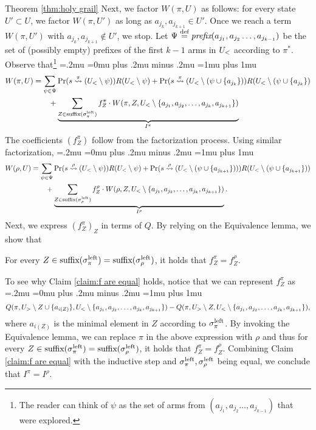 \begin{proofof}{Theorem \ref{thm:holy grail}}
Next, we factor $W(\pi,U)$ as follows: for every state $U'\subset U$, we factor $W(\pi,U')$ as long as $a_{j_k},a_{j_{k+1}}\in U'$. Once we reach a term $W(\pi,U')$ with $a_{j_k},a_{j_{k+1}}\notin U'$, we stop. Let $\Psi\stackrel{\text{def}}{=} \textit{prefix}(a_{j_1},a_{j_2}\dots, a_{j_{k-1}})$ be the set of (possibly empty) prefixes of the first $k-1$ arms in $U_<$ according to $\pi^*$. Observe that\footnote{The reader can think of $\psi$ as the set of arms from $(a_{j_1},a_{j_2}\dots, a_{j_{k-1}})$ that were explored.}  
{\thinmuskip=.2mu
\medmuskip=0mu plus .2mu minus .2mu
\thickmuskip=1mu plus 1mu
\begin{align}\label{eq:w of pi}
W(\pi,U)&=\sum_{\psi\in \Psi}
\Pr(s\stackrel{\pi}{\rightsquigarrow}(U_<\setminus \psi))R(U_<\setminus \psi)+\Pr(s\stackrel{\pi}{\rightsquigarrow}(U_<\setminus (\psi \cup \{a_{j_k}\}))R(U_<\setminus (\psi \cup \{a_{j_k}\})\nonumber \\
&\qquad +\underbrace{\sum_{\substack{Z\in \textnormal{suffix}(\sigma^{\textnormal{left}}_\pi)}}
f^\pi_Z \cdot W(\pi,Z,U_<\setminus \{a_{j_1},a_{j_2},\dots,a_{j_{k}},a_{j_{k+1}} \})}_{I^\pi}
\end{align}}
The coefficients $(f^\pi_Z)$ follow from the factorization process. Using similar factorization,
{\thinmuskip=.2mu
\medmuskip=0mu plus .2mu minus .2mu
\thickmuskip=1mu plus 1mu
\begin{align}\label{eq:w of rho}
W(\rho,U)&=\sum_{\psi\in \Psi}
\Pr(s\stackrel{\rho}{\rightsquigarrow}(U_<\setminus \psi))R(U_<\setminus \psi)+\Pr(s\stackrel{\rho}{\rightsquigarrow}(U_<\setminus (\psi \cup \{a_{j_{k+1}}\})))R(U_<\setminus (\psi \cup \{a_{j_{k+1}}\}))\nonumber\\
&\qquad +\underbrace{\sum_{\substack{Z\in \textnormal{suffix}(\sigma^{\textnormal{left}}_\rho)}}
f^\rho_Z \cdot W(\rho,Z,U_<\setminus \{a_{j_1},a_{j_2},\dots,a_{j_{k}},a_{j_{k+1}} \})}_{I^\rho}. 
\end{align}}%
Next, we express $(f^\pi_Z)_Z$ in terms of $Q$. By relying on the Equivalence lemma, we show that
\begin{claim}\label{claim:f are equal}
For every $Z\in \textnormal{suffix}(\sigma^{\textnormal{left}}_\pi)=\textnormal{suffix}(\sigma^{\textnormal{left}}_\rho)$, it holds that $f^\pi_Z=f^\rho_Z$.
\end{claim}
To see why Claim \ref{claim:f are equal} holds, notice that we can represent $f^\pi_Z$ as 
{\thinmuskip=.2mu
\medmuskip=0mu plus .2mu minus .2mu
\thickmuskip=1mu plus 1mu
\[
Q(\pi,U_>\setminus Z \cup \{a_{i(Z)}\}, U_<\setminus \{a_{j_1},a_{j_2},\dots,a_{j_{k}},a_{j_{k+1}} \})-Q(\pi,U_>\setminus Z, U_<\setminus \{a_{j_1},a_{j_2},\dots,a_{j_{k}},a_{j_{k+1}} \}),
\]}%
where $a_{i(Z)}$ is the minimal element in $Z$ according to $\sigma^{\textnormal{left}}_\pi$. By invoking the Equivalence lemma, we can replace $\pi$ in the above expression with $\rho$ and thus for every $Z\in \textnormal{suffix}(\sigma^{\textnormal{left}}_\pi)=\textnormal{suffix}(\sigma^{\textnormal{left}}_\rho)$, it holds that $f^\pi_Z=f^\rho_Z$. Combining Claim \ref{claim:f are equal} with the inductive step and $\sigma^{\textnormal{left}}_\pi,\sigma^{\textnormal{left}}_\rho$ being equal, we conclude that $I^\pi=I^\rho$. 



\end{proofof}
